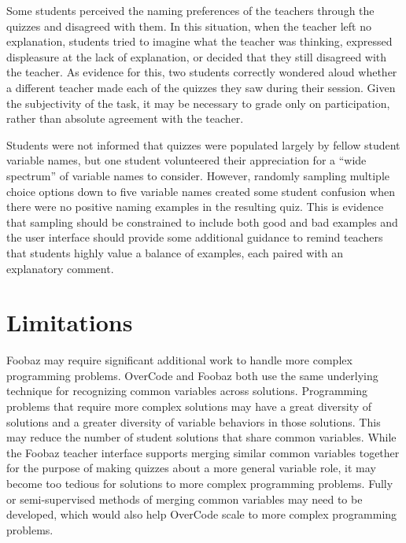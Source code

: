 Some students perceived the naming preferences of the teachers through the quizzes and disagreed with them. In this situation, when the teacher left no explanation, students tried to imagine what the teacher was thinking, expressed displeasure at the lack of explanation, or decided that they still disagreed with the teacher. As evidence for this, two students correctly wondered aloud whether a different teacher made each of the quizzes they saw during their session. Given the subjectivity of the task, it may be necessary to grade only on participation, rather than absolute agreement with the teacher.

Students were not informed that quizzes were populated largely by fellow student variable names, but one student volunteered their appreciation for a ``wide spectrum'' of variable names to consider. However, randomly sampling multiple choice options down to five variable names created some student confusion when there were no positive naming examples in the resulting quiz. This is evidence that sampling should be constrained to include both good and bad examples and the user interface should provide some additional guidance to remind teachers that students highly value a balance of examples, each paired with an explanatory comment.



\section{Limitations}

Foobaz may require significant additional work to handle more complex programming problems. OverCode and Foobaz both use the same underlying technique for recognizing common variables across solutions. Programming problems that require more complex solutions may have a great diversity of solutions and a greater diversity of variable behaviors in those solutions. This may reduce the number of student solutions that share common variables. While the Foobaz teacher interface supports merging similar common variables together for the purpose of making quizzes about a more general variable role, it may become too tedious for solutions to more complex programming problems. Fully or semi-supervised methods of merging common variables may need to be developed, which would also help OverCode scale to more complex programming problems.

